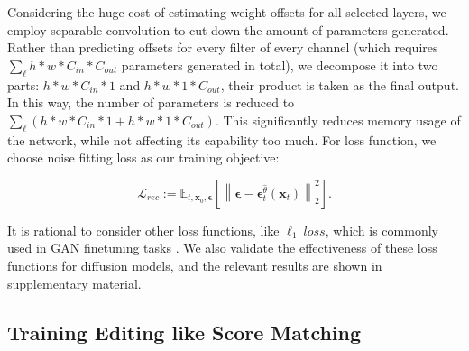 \documentclass[letterpaper]{article} %
\begin{document}
Considering the huge cost of estimating weight offsets for all selected layers,
we employ separable convolution \cite{alaluf2022hyperstyle} to cut down the amount of parameters generated. Rather than predicting offsets for every filter of every channel (which requires $\sum_{\ell}h * w * C_{in} * C_{out}$ parameters generated in total), we decompose it into two parts: $h*w*C_{in}*1$ and $h*w*1*C_{out}$, their product is taken as the final output. In this way, the number of parameters is reduced to $\sum_{\ell}(h*w*C_{in}*1 + h*w*1*C_{out})$.
This significantly reduces memory usage of the network, while not affecting its capability too much. For loss function, we choose noise fitting loss as our training objective:

\begin{equation}
    \mathcal{L}_{rec} := \mathbb{E}_{t,\bm{x}_0,\bm{\epsilon}}\left [ \left \| \bm{\epsilon} - \bm{\epsilon}_{t}^{\hat{\theta}}(\bm{x}_t) \right \|_{2}^{2}\right]. 
\end{equation}

It is rational to consider other loss functions, like $\ell_1 ~loss$, which is commonly used in GAN finetuning tasks \cite{alaluf2022hyperstyle, wang2022high}. We also validate the effectiveness of these loss functions for
diffusion models, and the relevant results are shown in supplementary material.


\subsection{Training Editing like Score Matching}
\end{document}

